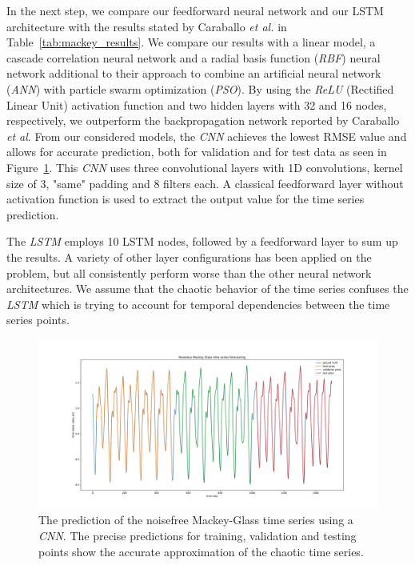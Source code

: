 \documentclass{article}
\begin{document}
In the next step, we compare our feedforward neural network and our LSTM
architecture with the results stated by Caraballo \textit{et al.}
\cite{caraballo2016} in Table~\ref{tab:mackey_results}. We
compare our results with a linear model, a cascade correlation neural network
and a radial basis function (\emph{RBF})
neural network additional to their approach to
combine an artificial neural network (\emph{ANN}) with particle swarm
optimization (\emph{PSO}). By
using the \emph{ReLU} (Rectified Linear Unit) activation function and two
hidden layers with 32 and 16 nodes, respectively, we outperform the
backpropagation network reported by Caraballo \textit{et al}.
From our considered models, the \emph{CNN} achieves the lowest RMSE value and
allows for accurate prediction, both for validation and for test data as seen
in Figure~\ref{fig:mackey_pred}. This \emph{CNN} uses three convolutional layers
with 1D convolutions, kernel size of 3, "same" padding and 8
filters each. A classical
feedforward layer without activation function is used to extract the output
value for the time series prediction.

The \emph{LSTM} employs 10 LSTM nodes, followed by a feedforward layer to sum up
the results. A variety of other layer configurations has been applied
on the problem,
but all consistently perform worse than the other neural network architectures.
We assume that the chaotic behavior of the time series confuses the \emph{LSTM}
which is trying to account for temporal dependencies between the time series
points.

\begin{figure}
    \centering
    \includegraphics[width=\textwidth]{figures/mg_pred_cnn.pdf}
    \caption{The prediction of the noisefree Mackey-Glass time series using a
        \emph{CNN}. The precise predictions for training, validation and testing
        points show the accurate approximation of the chaotic time series.}
    \label{fig:mackey_pred}
\end{figure}
\end{document}
